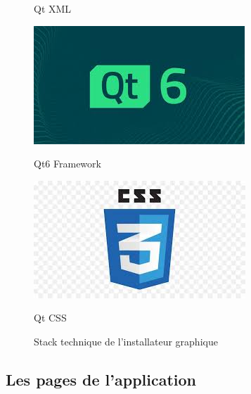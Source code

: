 \begin{figure}[hbt!]
\begin{minipage}[b]{0.18\textwidth}
    \caption{Qt XML}
  \end{minipage}\hfill
  \begin{minipage}[b]{0.18\textwidth}
    \includegraphics[width=\textwidth]{images_pfe/qt6.jpeg}
    \caption{Qt6 Framework}
  \end{minipage}\hfill
  \begin{minipage}[b]{0.18\textwidth}
    \includegraphics[width=\textwidth]{images_pfe/css.jpeg}
    \caption{Qt CSS}
  \end{minipage}\hfill
  \caption{Stack technique de l'installateur graphique}
  \label{fig:krakenistallerlanguage}
\end{figure}
\FloatBarrier
 
  
  
  
 


\subsection{ Les pages de l'application}


